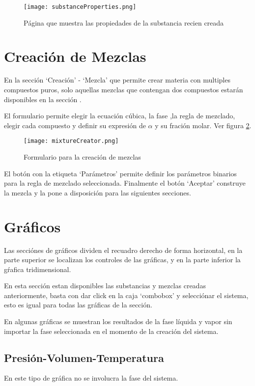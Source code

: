 	\begin{figure}[!h]
		\texttt{[image: substanceProperties.png]}
		\caption{Página que muestra las propiedades de la substancia recien creada}
		\label{fig:substanceProperties}
	\end{figure}

\section{Creación de Mezclas}\label{sec:webMixtureCreator}

	En la sección `Creación' - `Mezcla' que permite crear materia con multiples compuestos puros, solo aquellas mezclas que contengan dos compuestos estarán disponibles en la sección .

	El formulario permite elegir la ecuación cúbica, la fase ,la regla de mezclado, elegir cada compuesto y definir su expresión de $\alpha$ y su fración molar. Ver figura \ref{fig:webMixCreator}.

	\begin{figure}[!h]
		\texttt{[image: mixtureCreator.png]}
		\caption{Formulario para la creación de mezclas}
		\label{fig:webMixCreator}
	\end{figure}

	El botón con la etiqueta `Parámetros' permite definir los parámetros binarios para la regla de mezclado seleccionada. Finalmente el botón `Aceptar' construye la mezcla y la pone a disposición para las siguientes secciones.

\section{Gráficos}

	Las secciónes de gráficos dividen el recuadro derecho de forma horizontal, en la parte superior se localizan los controles de las gráficas, y en la parte inferior la gŕafica tridimensional.

	En esta sección estan disponibles las substancias y mezclas creadas anteriormente, basta con dar click en la caja `combobox' y selecciónar el sistema, esto es igual para todas las gráficas de la sección.

	En algunas gráficas se muestran los resultados de la fase líquida y vapor sin importar la fase seleccionada en el momento de la creación del sistema.

	\subsection{Presión-Volumen-Temperatura}\label{subsec:pvt}
		En este tipo de gráfica no se involucra la fase del sistema. 

